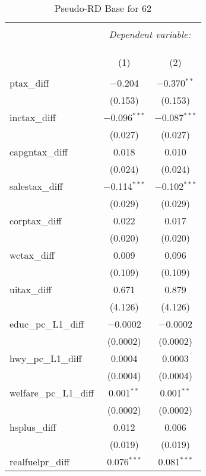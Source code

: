 
\begin{table}[!htbp] \centering 
  \caption{Pseudo-RD Base for  62} 
  \label{} 
\begin{tabular}{@{\extracolsep{5pt}}lcc} 
\\[-1.8ex]\hline 
\hline \\[-1.8ex] 
 & \multicolumn{2}{c}{\textit{Dependent variable:}} \\ 
\cline{2-3} 
\\[-1.8ex] & \multicolumn{2}{c}{ } \\ 
\\[-1.8ex] & (1) & (2)\\ 
\hline \\[-1.8ex] 
 ptax\_diff & $-$0.204 & $-$0.370$^{**}$ \\ 
  & (0.153) & (0.153) \\ 
  inctax\_diff & $-$0.096$^{***}$ & $-$0.087$^{***}$ \\ 
  & (0.027) & (0.027) \\ 
  capgntax\_diff & 0.018 & 0.010 \\ 
  & (0.024) & (0.024) \\ 
  salestax\_diff & $-$0.114$^{***}$ & $-$0.102$^{***}$ \\ 
  & (0.029) & (0.029) \\ 
  corptax\_diff & 0.022 & 0.017 \\ 
  & (0.020) & (0.020) \\ 
  wctax\_diff & 0.009 & 0.096 \\ 
  & (0.109) & (0.109) \\ 
  uitax\_diff & 0.671 & 0.879 \\ 
  & (4.126) & (4.126) \\ 
  educ\_pc\_L1\_diff & $-$0.0002 & $-$0.0002 \\ 
  & (0.0002) & (0.0002) \\ 
  hwy\_pc\_L1\_diff & 0.0004 & 0.0003 \\ 
  & (0.0004) & (0.0004) \\ 
  welfare\_pc\_L1\_diff & 0.001$^{**}$ & 0.001$^{**}$ \\ 
  & (0.0002) & (0.0002) \\ 
  hsplus\_diff & 0.012 & 0.006 \\ 
  & (0.019) & (0.019) \\ 
  realfuelpr\_diff & 0.076$^{***}$ & 0.081$^{***}$ \\ 

\end{tabular}
\end{table}

